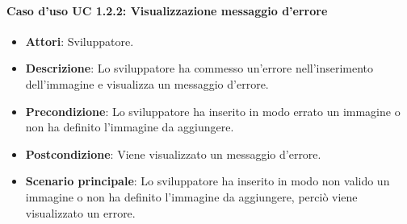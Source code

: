 \paragraph{Caso d'uso UC 1.2.2: Visualizzazione messaggio d'errore}

\FloatBarrier
\begin{itemize}
\item\textbf{Attori}: Sviluppatore.
\item\textbf{Descrizione}: Lo sviluppatore ha commesso un'errore nell'inserimento dell'immagine e visualizza un messaggio d'errore.
\item\textbf{Precondizione}: Lo sviluppatore ha inserito in modo errato un immagine o non ha definito l'immagine da aggiungere.
\item\textbf{Postcondizione}: Viene visualizzato un messaggio d'errore.
\item\textbf{Scenario principale}: Lo sviluppatore ha inserito in modo non valido un immagine o non ha definito l'immagine da aggiungere, perciò viene visualizzato un errore.
\end{itemize}
